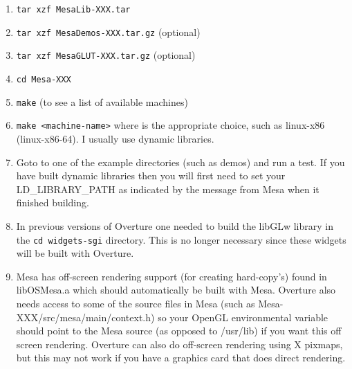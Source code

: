 \documentclass{article}
\begin{document}
 \begin{enumerate}
   \item {\tt tar xzf MesaLib-XXX.tar}
   \item {\tt tar xzf MesaDemos-XXX.tar.gz} (optional)
   \item {\tt tar xzf MesaGLUT-XXX.tar.gz} (optional)
   \item {\tt cd Mesa-XXX}
   \item {\tt make} (to see a list of available machines)
   \item {\tt make <machine-name>} where {\tt <machine-name>} is the appropriate choice, such as
        linux-x86 (linux-x86-64). I usually use dynamic libraries.
   \item Goto to one of the example directories (such as demos) and run a test. If you have built
       dynamic libraries then you will first need to set your LD\_LIBRARY\_PATH as indicated by
       the message from Mesa when it finished building.
   \item In previous versions of Overture one needed to build the libGLw library in the
        {\tt cd widgets-sgi} directory. This is no longer necessary since these widgets
      will be built with Overture.
   \item Mesa has off-screen rendering support (for creating hard-copy's) found in libOSMesa.a which should
        automatically be built with Mesa. Overture also needs access to some of the source files in Mesa
        (such as Mesa-XXX/src/mesa/main/context.h)  so your OpenGL environmental variable should point to the
        Mesa source (as opposed to /usr/lib) if you want this off screen rendering. Overture can also
        do off-screen rendering using X pixmaps, but this may not work if you have a graphics card that
        does direct rendering.

\end{enumerate}
\end{document}
